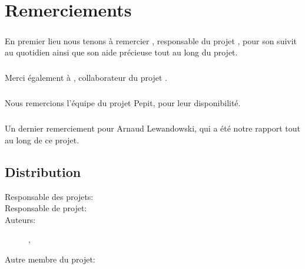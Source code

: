 \documentclass[french]{report}
\begin{document}


\pagestyle{fancyplain}
\renewcommand{\chaptermark}[1]{\markboth{\chaptername\ \thechapter. #1}{}}
\renewcommand{\sectionmark}[1]{\markright{\thesection. #1}}
\lhead[]{\fancyplain{}{\bfseries\leftmark}}
\rhead[]{\fancyplain{}{\bfseries\thepage}}
\cfoot{}
% 
%
\chapter*{Remerciements}
\paragraph{}En premier lieu nous tenons à remercier \civiliteResponsableProet{} \responsableProjet{}, responsable du projet \pepitMobil, pour son suivit au quotidien ainsi que son aide précieuse tout au long du projet.
\paragraph{}Merci également à \etudiantSL, collaborateur du projet \pepitMobil.
\paragraph{}Nous remercions l'équipe du projet Pepit, pour leur disponibilité.
\paragraph{}Un dernier remerciement pour Arnaud Lewandowski, qui a été notre rapport tout au long de ce projet.


\section*{Distribution}
\begin{description}
\item [Responsable des projets:] \responsableDesProjets
\item [Responsable de projet:] \responsableProjet
\item [Auteurs:] \etudiantJP, \etudiantRD
\item [Autre membre du projet:] \etudiantSL
\end{description}
\end{document}
